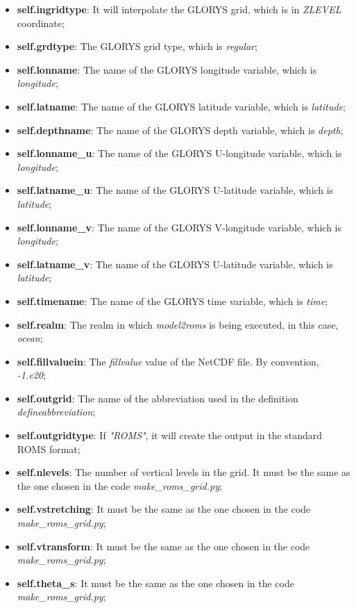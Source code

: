 \begin{itemize}
    \item \textbf{self.ingridtype}: It will interpolate the GLORYS grid, which is in \textit{ZLEVEL} coordinate;
    \item \textbf{self.grdtype}: The GLORYS grid type, which is \textit{regular};
    \item \textbf{self.lonname}: The name of the GLORYS longitude variable, which is \textit{longitude};
    \item \textbf{self.latname}: The name of the GLORYS latitude variable, which is \textit{latitude};
    \item \textbf{self.depthname}: The name of the GLORYS depth variable, which is \textit{depth};
    \item \textbf{self.lonname\_u}: The name of the GLORYS U-longitude variable, which is \textit{longitude};
    \item \textbf{self.latname\_u}: The name of the GLORYS U-latitude variable, which is \textit{latitude};
    \item \textbf{self.lonname\_v}: The name of the GLORYS V-longitude variable, which is \textit{longitude};
    \item \textbf{self.latname\_v}: The name of the GLORYS U-latitude variable, which is \textit{latitude};
    \item \textbf{self.timename}: The name of the GLORYS time variable, which is \textit{time};
    \item \textbf{self.realm}: The realm in which \textit{model2roms} is being executed, in this case, \textit{ocean};
    \item \textbf{self.fillvaluein}: The \textit{fillvalue} value of the NetCDF file. By convention, \textit{-1.e20};
    \item \textbf{self.outgrid}: The name of the abbreviation used in the definition \textit{defineabbreviation};
    \item \textbf{self.outgridtype}: If \textit{"ROMS"}, it will create the output in the standard ROMS format;
    \item \textbf{self.nlevels}: The number of vertical levels in the grid. It must be the same as the one chosen in the code \textit{make\_roms\_grid.py};
    \item \textbf{self.vstretching}: It must be the same as the one chosen in the code \textit{make\_roms\_grid.py};
    \item \textbf{self.vtransform}: It must be the same as the one chosen in the code \textit{make\_roms\_grid.py};
    \item \textbf{self.theta\_s}: It must be the same as the one chosen in the code \textit{make\_roms\_grid.py};

\end{itemize}
